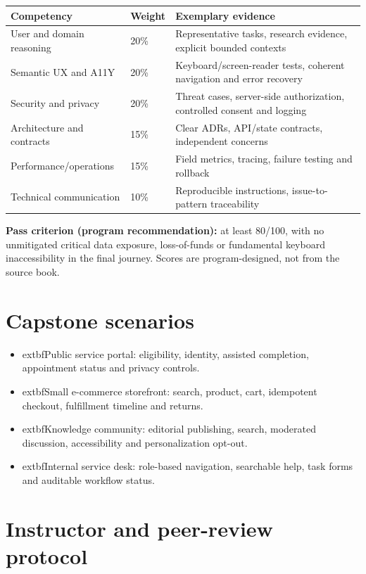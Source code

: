 \documentclass[11pt]{article}
\begin{document}
\begin{tabularx}{\linewidth}{@{}p{45mm}p{19mm}X@{}}\toprule
Competency & Weight & Exemplary evidence\\\midrule
User and domain reasoning & 20\% & Representative tasks, research evidence, explicit bounded contexts\\
Semantic UX and A11Y & 20\% & Keyboard/screen-reader tests, coherent navigation and error recovery\\
Security and privacy & 20\% & Threat cases, server-side authorization, controlled consent and logging\\
Architecture and contracts & 15\% & Clear ADRs, API/state contracts, independent concerns\\
Performance/operations & 15\% & Field metrics, tracing, failure testing and rollback\\
Technical communication & 10\% & Reproducible instructions, issue-to-pattern traceability\\
\bottomrule\end{tabularx}
\textbf{Pass criterion (program recommendation):} at least 80/100, with no unmitigated critical data exposure, loss-of-funds or fundamental keyboard inaccessibility in the final journey. Scores are program-designed, not from the source book.

\section{Capstone scenarios}
\begin{itemize}
\item 	extbf{Public service portal:} eligibility, identity, assisted completion, appointment status and privacy controls.
\item 	extbf{Small e-commerce storefront:} search, product, cart, idempotent checkout, fulfillment timeline and returns.
\item 	extbf{Knowledge community:} editorial publishing, search, moderated discussion, accessibility and personalization opt-out.
\item 	extbf{Internal service desk:} role-based navigation, searchable help, task forms and auditable workflow status.
\end{itemize}

\section{Instructor and peer-review protocol}
\end{document}
